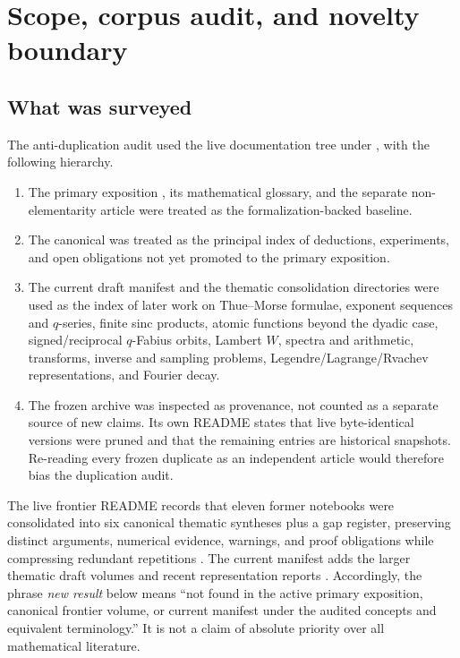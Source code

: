 \documentclass[11pt,oneside]{article}
\theoremstyle{definition}
\theoremstyle{remark}
\begin{document}
\tableofcontents
\newpage

\section{Scope, corpus audit, and novelty boundary}
\label{sec:audit}

\subsection{What was surveyed}

The anti-duplication audit used the live documentation tree under
, with the following hierarchy.

\begin{enumerate}
\item The primary exposition
,
its mathematical glossary, and the separate non-elementarity article were treated as the
formalization-backed baseline.
\item The canonical
was treated as the principal index of deductions, experiments, and open obligations not yet
promoted to the primary exposition.
\item The current draft manifest and the thematic consolidation directories were used as the
index of later work on Thue--Morse formulae, exponent sequences and \(q\)-series, finite sinc
products, atomic functions beyond the dyadic case, signed/reciprocal \(q\)-Fabius orbits,
Lambert \(W\), spectra and arithmetic, transforms, inverse and sampling problems,
Legendre/Lagrange/Rvachev representations, and Fourier decay.
\item The frozen archive was inspected as provenance, not counted as a separate source of new
claims.  Its own README states that live byte-identical versions were pruned and that the
remaining entries are historical snapshots.  Re-reading every frozen duplicate as an
independent article would therefore bias the duplication audit.
\end{enumerate}

The live frontier README records that eleven former notebooks were consolidated into six
canonical thematic syntheses plus a gap register, preserving distinct arguments, numerical
evidence, warnings, and proof obligations while compressing redundant repetitions
\cite{repoFrontier}.  The current manifest adds the larger thematic draft volumes and recent
representation reports \cite{repoManifest}.  Accordingly, the phrase \emph{new result} below
means ``not found in the active primary exposition, canonical frontier volume, or current
manifest under the audited concepts and equivalent terminology.''  It is not a claim of
absolute priority over all mathematical literature.
\end{document}
